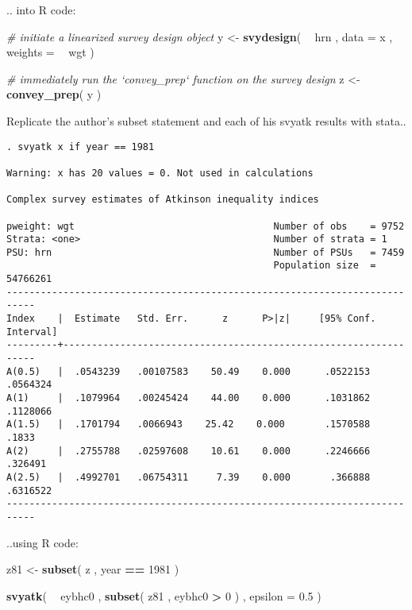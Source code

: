 \documentclass[]{book}
\newenvironment{Shaded}{\begin{snugshade}}{\end{snugshade}}
\newcommand{\CommentTok}[1]{\textcolor[rgb]{0.56,0.35,0.01}{\textit{#1}}}
\newcommand{\DataTypeTok}[1]{\textcolor[rgb]{0.13,0.29,0.53}{#1}}
\newcommand{\DecValTok}[1]{\textcolor[rgb]{0.00,0.00,0.81}{#1}}
\newcommand{\FloatTok}[1]{\textcolor[rgb]{0.00,0.00,0.81}{#1}}
\newcommand{\KeywordTok}[1]{\textcolor[rgb]{0.13,0.29,0.53}{\textbf{#1}}}
\newcommand{\NormalTok}[1]{#1}
\newcommand{\OperatorTok}[1]{\textcolor[rgb]{0.81,0.36,0.00}{\textbf{#1}}}
\newcommand{\StringTok}[1]{\textcolor[rgb]{0.31,0.60,0.02}{#1}}
\begin{document}
.. into R code:

\begin{Shaded}
\begin{Highlighting}[]
\CommentTok{# initiate a linearized survey design object}
\NormalTok{y <-}\StringTok{ }\KeywordTok{svydesign}\NormalTok{( }\OperatorTok{~}\StringTok{ }\NormalTok{hrn , }\DataTypeTok{data =}\NormalTok{ x , }\DataTypeTok{weights =} \OperatorTok{~}\StringTok{ }\NormalTok{wgt )}

\CommentTok{# immediately run the `convey_prep` function on the survey design}
\NormalTok{z <-}\StringTok{ }\KeywordTok{convey_prep}\NormalTok{( y )}
\end{Highlighting}
\end{Shaded}

Replicate the author's subset statement and each of his svyatk results with stata..

\begin{verbatim}
. svyatk x if year == 1981
 
Warning: x has 20 values = 0. Not used in calculations

Complex survey estimates of Atkinson inequality indices
 
pweight: wgt                                   Number of obs    = 9752
Strata: <one>                                  Number of strata = 1
PSU: hrn                                       Number of PSUs   = 7459
                                               Population size  = 54766261
---------------------------------------------------------------------------
Index    |  Estimate   Std. Err.      z      P>|z|     [95% Conf. Interval]
---------+-----------------------------------------------------------------
A(0.5)   |  .0543239   .00107583    50.49    0.000      .0522153   .0564324
A(1)     |  .1079964   .00245424    44.00    0.000      .1031862   .1128066
A(1.5)   |  .1701794   .0066943    25.42    0.000       .1570588      .1833
A(2)     |  .2755788   .02597608    10.61    0.000      .2246666    .326491
A(2.5)   |  .4992701   .06754311     7.39    0.000       .366888   .6316522
---------------------------------------------------------------------------
\end{verbatim}

..using R code:

\begin{Shaded}
\begin{Highlighting}[]
\NormalTok{z81 <-}\StringTok{ }\KeywordTok{subset}\NormalTok{( z , year }\OperatorTok{==}\StringTok{ }\DecValTok{1981}\NormalTok{ )}

\KeywordTok{svyatk}\NormalTok{( }\OperatorTok{~}\StringTok{ }\NormalTok{eybhc0 , }\KeywordTok{subset}\NormalTok{( z81 , eybhc0 }\OperatorTok{>}\StringTok{ }\DecValTok{0}\NormalTok{ ) , }\DataTypeTok{epsilon =} \FloatTok{0.5}\NormalTok{ )}
\end{Highlighting}
\end{Shaded}
\end{document}

